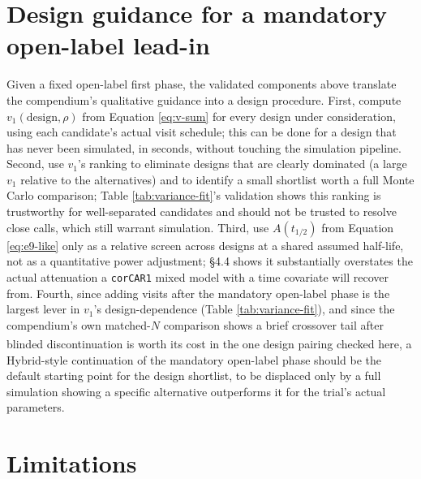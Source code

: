 \documentclass[
  11pt,
]{article}
\begin{document}
\section{Design guidance for a mandatory open-label lead-in}\label{design-guidance-for-a-mandatory-open-label-lead-in}

Given a fixed open-label first phase, the validated components above
translate the compendium's qualitative guidance into a design
procedure. First, compute \(v_1(\mathrm{design}, \rho)\) from
Equation \eqref{eq:v-sum} for every design under consideration, using
each candidate's actual visit schedule; this can be done for a
design that has never been simulated, in seconds, without touching
the simulation pipeline. Second, use \(v_1\)'s ranking to eliminate
designs that are clearly dominated (a large \(v_1\) relative to the
alternatives) and to identify a small shortlist worth a full Monte
Carlo comparison; Table \ref{tab:variance-fit}'s validation shows
this ranking is trustworthy for well-separated candidates and should
not be trusted to resolve close calls, which still warrant
simulation. Third, use \(A(t_{1/2})\) from Equation \eqref{eq:e9-like}
only as a relative screen across designs at a shared assumed
half-life, not as a quantitative power adjustment; §4.4 shows it
substantially overstates the actual attenuation a \texttt{corCAR1} mixed
model with a time covariate will recover from. Fourth, since adding
visits after the mandatory open-label phase is the largest lever in
\(v_1\)'s design-dependence (Table \ref{tab:variance-fit}), and since
the compendium's own matched-\(N\) comparison shows a brief crossover
tail after blinded discontinuation is worth its cost in the one
design pairing checked here\textsuperscript{}, a Hybrid-style
continuation of the mandatory open-label phase should be the default
starting point for the design shortlist, to be displaced only by a
full simulation showing a specific alternative outperforms it for
the trial's actual parameters.

\section{Limitations}\label{limitations}
\end{document}
